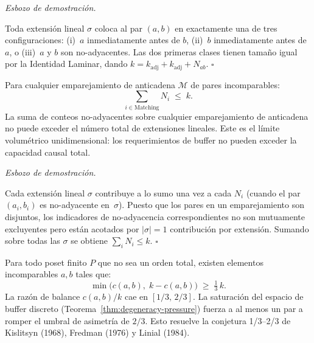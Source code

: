 \documentclass[11pt, a4paper, openany]{book}
\renewenvironment{proof}[1][Demostraci\'on]{%
  \par\noindent\textit{#1.}\quad
}{\hfill$\square$\par\medskip}
\begin{document}
\begin{proof}[Esbozo de demostraci\'on]
Toda extensi\'on lineal $\sigma$ coloca al par $(a, b)$ en exactamente
una de tres configuraciones: (i)~$a$ inmediatamente antes de $b$,
(ii)~$b$ inmediatamente antes de $a$, o (iii)~$a$ y $b$ son
no-adyacentes. Las dos primeras clases tienen tama\~no igual por la
Identidad Laminar, dando
$k = k_{\mathrm{adj}} + k_{\mathrm{adj}} + N_{ab}$.
\end{proof}

\begin{theorem}
\label{thm:degeneracy-pressure}
Para cualquier emparejamiento de anticadena $\mathcal{M}$ de pares
incomparables:
\begin{equation}
\label{eq:degeneracy-pressure}
  \sum_{i \in \mathrm{Matching}} N_i \;\leq\; k.
\end{equation}
La suma de conteos no-adyacentes sobre cualquier emparejamiento de
anticadena no puede exceder el n\'umero total de extensiones lineales.
Este es el l\'imite volum\'etrico unidimensional: los requerimientos de
buffer no pueden exceder la capacidad causal total.
\end{theorem}

\begin{proof}[Esbozo de demostraci\'on]
Cada extensi\'on lineal $\sigma$ contribuye a lo sumo una vez a cada
$N_i$ (cuando el par $(a_i, b_i)$ es no-adyacente en~$\sigma$). Puesto
que los pares en un emparejamiento son disjuntos, los indicadores de
no-adyacencia correspondientes no son mutuamente excluyentes pero
est\'an acotados por $|\sigma| = 1$ contribuci\'on por extensi\'on.
Sumando sobre todas las $\sigma$ se obtiene $\sum_i N_i \leq k$.
\end{proof}

\begin{theorem}
\label{thm:law-of-balance}
Para todo poset finito $P$ que no sea un orden total, existen elementos
incomparables $a, b$ tales que:
\begin{equation}
\label{eq:law-of-balance}
  \min\bigl(c(a,b),\; k - c(a,b)\bigr) \;\geq\; \tfrac{1}{3}\,k.
\end{equation}
La raz\'on de balance $c(a,b)/k$ cae en $[1/3,\, 2/3]$. La
saturaci\'on del espacio de buffer discreto
(Teorema~\ref{thm:degeneracy-pressure}) fuerza a al menos un par a
romper el umbral de asimetr\'ia de $2/3$. Esto resuelve la conjetura
1/3--2/3 de Kislitsyn (1968), Fredman (1976) y Linial (1984).
\end{theorem}
\end{document}
